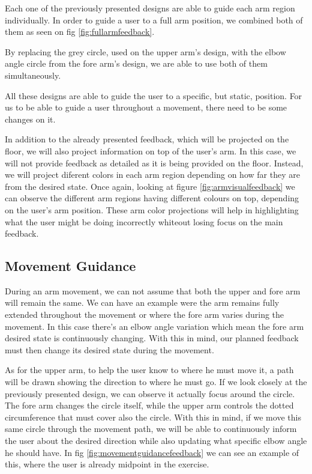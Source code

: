 Each one of the previously presented designs are able to guide each arm region individually.
In order to guide a user to a full arm position, we combined both of them as seen on fig \ref{fig:fullarmfeedback}.

By replacing the grey circle, used on the upper arm's design, with the elbow angle circle from the fore arm's design, we are able to use both of them simultaneously. 

All these designs are able to guide the user to a specific, but static, position. For us to be able to guide a user throughout a movement, there need to be some changes on it.

In addition to the already presented feedback, which will be projected on the floor, we will also project information on top of the user's arm. 
In this case, we will not provide feedback as detailed as it is being provided on the floor. 
Instead, we will project diferent colors in each arm region depending on how far they are from the desired state. 
Once again, looking at figure \ref{fig:armvisualfeedback} we can observe the 
different arm regions having different colours on top, depending on the user's arm position.
These arm color projections will help in highlighting what the user might be doing incorrectly whiteout losing focus on the main feedback.

\subsection{Movement Guidance}

During an arm movement, we can not assume that both the upper and fore arm will remain the same. We can have an example were the arm remains fully extended throughout the movement or where the fore arm varies during the movement. In this case there's an elbow angle variation which mean the fore arm desired state is continuously changing.
With this in mind, our planned feedback must then change its desired state during the movement.

As for the upper arm, to help the user know to where he must move it, a path will be drawn showing the direction to where he must go. If we look closely at the previously presented design, we can observe it actually focus around the circle. The fore arm changes the circle itself, while the upper arm controls the dotted circumference that must cover also the circle. With this in mind, if we move this same circle through the movement path, we will be able to continuously inform the user about the desired direction while also updating what specific elbow angle he should have. In fig \ref{fig:movementguidancefeedback} we can see an example of this, where the user is already midpoint in the exercise.



